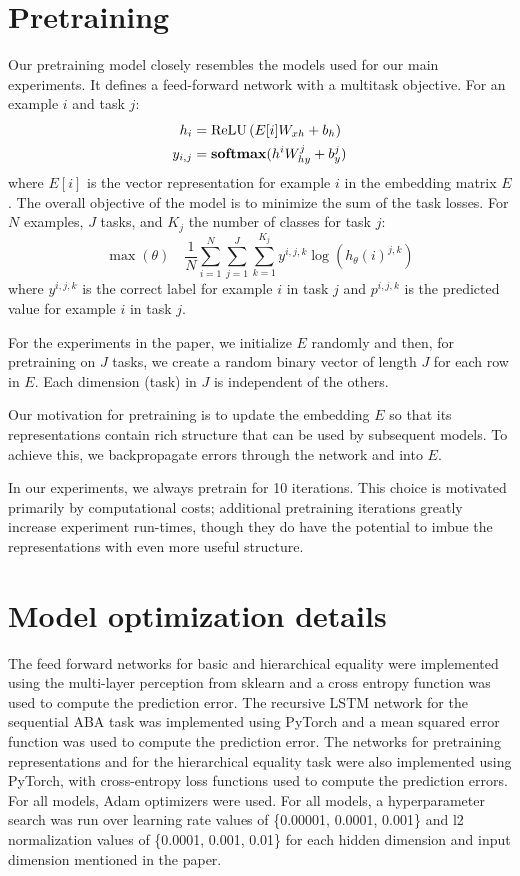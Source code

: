 \section{Pretraining}\label{app:pretraining}

Our pretraining model closely resembles the models used for our main experiments. It defines a feed-forward network with a multitask objective. For an example $i$ and task $j$:
%
\begin{align}
  h_{i} &= \operatorname{ReLU}\left( E[i]W_{xh} + b_{h} \right) \\
  y_{i,j} &= \mathbf{softmax}(h^{i}W_{hy}^{j} + b_{y}^{j})
\end{align}
%
where $E[i]$ is the vector representation for example $i$ in the embedding matrix $E$. The overall objective of the model is to minimize the sum of the task losses. For $N$ examples, $J$ tasks, and $K_{j}$ the number of classes for task $j$:
%
\begin{equation}
  \max(\theta)
  \quad
  \frac{1}{N}
  \sum_{i=1}^{N}
  \sum_{j=1}^{J}
  \sum_{k=1}^{K_{j}}
  y^{i,j,k} \log \left( h_{\theta}(i)^{j,k} \right)
\end{equation}
%
where $y^{i,j,k}$ is the correct label for example $i$ in task $j$ and $p^{i,j,k}$ is the predicted value for example $i$ in task $j$.

For the experiments in the paper, we initialize $E$ randomly and then, for pretraining on $J$ tasks, we create a random binary vector of length $J$ for each row in $E$. Each dimension (task) in $J$ is independent of the others.

Our motivation for pretraining is to update the embedding $E$ so that its representations contain rich structure that can be used by subsequent models. To achieve this, we backpropagate errors through the network and into $E$.

In our experiments, we always pretrain for 10 iterations. This choice is motivated primarily by computational costs; additional pretraining iterations greatly increase experiment run-times, though they do have the potential to imbue the representations with even more useful structure.


\section{Model optimization details}\label{app:optimization}

The feed forward networks for basic and hierarchical equality were implemented using the multi-layer perception from sklearn and a cross entropy function was used to compute the prediction error. The recursive LSTM network for the sequential ABA task was implemented using PyTorch and a mean squared error function was used to compute the prediction error. The networks for pretraining representations and for the hierarchical equality task were also implemented using PyTorch, with cross-entropy loss functions used to compute the prediction errors. For all models, Adam optimizers \citep{Kingma:Ba:2015} were used. For all models, a hyperparameter search was run over learning rate values of \{0.00001, 0.0001, 0.001\} and l2 normalization values of \{0.0001, 0.001, 0.01\} for each hidden dimension and input dimension mentioned in the paper.


